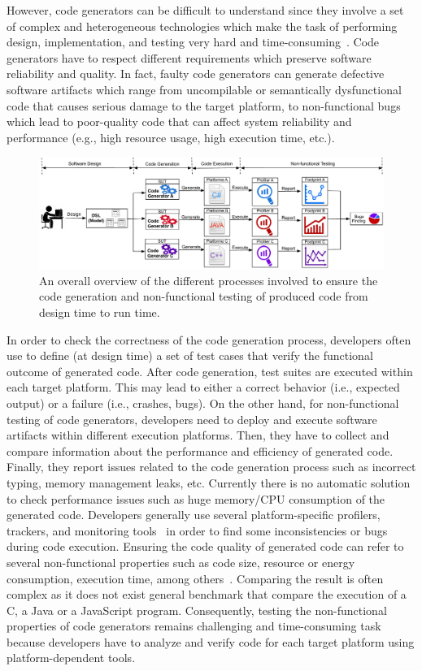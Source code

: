 However, code generators can be difficult to understand since they involve a set of complex and heterogeneous technologies which make the task of performing design, implementation, and testing very hard and time-consuming~\cite{france2007model,guana2015developers}. Code generators have to respect different requirements which preserve software reliability and quality. In fact, faulty code generators can generate defective software artifacts which range from uncompilable or semantically dysfunctional code that causes serious damage to the target platform, to non-functional bugs which lead to poor-quality code that can affect system reliability and performance (e.g., high resource usage, high execution time, etc.). 
\begin{figure}[h]
	\includegraphics[width=1\linewidth]{Ressources/background.pdf}
	\caption{An overall overview of the different processes involved to ensure the code generation and non-functional testing of produced code from design time to run time.}
\end{figure}

In order to check the correctness of the code generation process, developers often use to define (at design time) a set of test cases that verify the functional outcome of generated code. After code generation, test suites are executed within each target platform. This may lead to either a correct behavior (i.e., expected output) or a failure (i.e., crashes, bugs). On the other hand, for non-functional testing of code generators, developers need to deploy and execute software artifacts within different execution platforms. Then, they have to collect and compare information about the performance and efficiency of generated code. Finally, they report issues related to the code generation process such as incorrect typing, memory management leaks, etc. Currently there is no automatic solution to check performance issues such as huge memory/CPU consumption of the generated code.  Developers generally use several platform-specific profilers, trackers, and monitoring tools~\cite{guana2014chaintracker,delgado2004taxonomy} in order to find some inconsistencies or bugs during code execution. Ensuring the code quality of generated code can refer to several non-functional properties such as code size, resource or energy consumption, execution time, among others~\cite{pan2006fast}. Comparing the result is often complex as it does not exist general benchmark that compare the execution of a C, a Java or a JavaScript program. Consequently, testing the non-functional properties of code generators remains challenging and time-consuming task because developers have to analyze and verify code for each target platform using platform-dependent tools.


